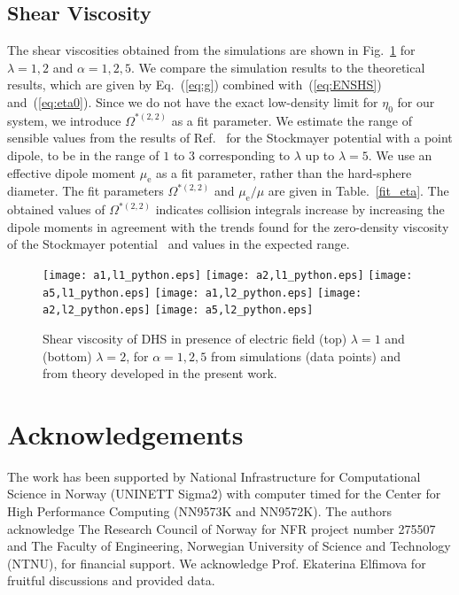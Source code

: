 \documentclass[preprint,pre,aps,superscriptaddress,a4paper]{revtex4}
\begin{document}
\subsection{Shear Viscosity}
The shear viscosities obtained from the simulations are shown  in Fig.~\ref{DHS_eta} for  $\lambda=1,2$ and $\alpha=1,2,5$. 
We compare the simulation results to the theoretical results, which are given by Eq.~(\ref{eq:g}) combined with~(\ref{eq:ENSHS}) and~(\ref{eq:eta0}).
Since we do not have the exact low-density limit for $\eta_0$ for our system, we introduce ${\Omega^{*(2,2)}}$ as a fit parameter. 
We  estimate the range of sensible values from the results of Ref.~\cite{monchick:61:0} for the Stockmayer potential with a point dipole, to be in the range of $1$ to $3$ corresponding to $\lambda$ up to $\lambda=5$.
We use an effective dipole moment $\mu_\mathrm{e}$ as a fit parameter, rather than the hard-sphere diameter.
The fit parameters ${\Omega^{*(2,2)}}$ and $\mu_\mathrm{e}/\mu$ are given in Table.~\ref{fit_eta}.
The obtained values  of ${\Omega^{*(2,2)}}$ indicates collision integrals increase by increasing the dipole moments in agreement with the trends found for the zero-density viscosity of the Stockmayer potential~\citep{monchick:61:0} and values in the expected range.

\begin{figure}[]
\texttt{[image: a1,l1\_python.eps]}
\texttt{[image: a2,l1\_python.eps]}
\texttt{[image: a5,l1\_python.eps]}
\texttt{[image: a1,l2\_python.eps]}
\texttt{[image: a2,l2\_python.eps]}
\texttt{[image: a5,l2\_python.eps]}
\caption{Shear viscosity of DHS in presence of electric field (top) $\lambda=1$ and (bottom)  $\lambda=2$, for $\alpha=1,2,5$ from simulations (data points) and from theory developed in the present work. }
\label{DHS_eta}
\end{figure}



\section*{Acknowledgements}
The work has been supported by National Infrastructure for Computational Science in Norway
(UNINETT Sigma2) with computer timed for the Center for High Performance Computing (NN9573K and NN9572K). The authors acknowledge The Research Council of Norway for NFR project number 275507  and The Faculty of Engineering, Norwegian University of Science and Technology (NTNU), for financial support. We acknowledge Prof. Ekaterina Elfimova for fruitful discussions and provided data.  

\label{ed}



\end{document}
